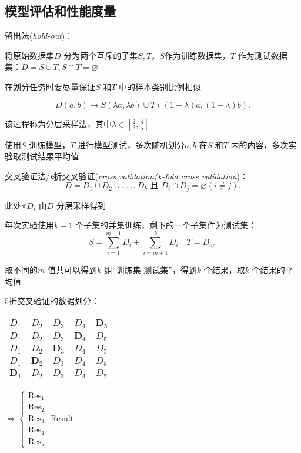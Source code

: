 \subsection{模型评估和性能度量}%
\label{sub:模型评估和性能度量}
\begin{notation}
    留出法(\textit{hold-out})：

    将原始数据集$D$ 分为两个互斥的子集$S,T$，$S$作为训练数据集，$T$ 作为测试数据集：$D=S\cup T,S\cap T=\varnothing $
\end{notation}
在划分任务时要尽量保证$S$ 和$T$ 中的样本类别比例相似
\begin{eg}
    \[
        D\left( a,b \right)  \to S\left( \lambda a,\lambda b \right) \cup T\left( \left( 1-\lambda \right) a,\left( 1-\lambda \right) b \right)
    .\] 

    该过程称为分层采样法，其中$\lambda\in [\frac{2}{3} , \frac{4}{5} ]$

    使用$S$ 训练模型，$T$ 进行模型测试，多次随机划分$a,b$ 在$S$ 和$T$ 内的内容，多次实验取测试结果平均值
\end{eg}
\begin{notation}
    交叉验证法/\textit{k}折交叉验证(\textit{cross validation}/\textit{k-fold cross validation})：\[
        D=D_1\cup D_2\cup \ldots\cup D_k\text{ 且 }D_i\cap D_j=\varnothing \left( i\neq j \right)
    .\]   

    此处$\forall D_i$ 由$D$ 分层采样得到

    每次实验使用$k-1$ 个子集的并集训练，剩下的一个子集作为测试集：\[
        S=\sum_{i=1}^{m-1} D_i + \sum_{i=m+1}^{k}D_i\quad T=D_m
    .\] 

    取不同的$m$ 值共可以得到$k$ 组“训练集-测试集”，得到$k$ 个结果，取$k$ 个结果的平均值
\end{notation}
\begin{eg}
    5折交叉验证的数据划分：
    \begin{table}[htpb]
        \centering
        \begin{tabular}{|c|c|c|c|c|}
        \hline
        $D_1$ & $D_2$ & $D_3$ & $D_4$ & $\bm{D}_5$ \\
        \hline
        $D_1$ & $D_2$ & $D_3$ & $\bm{D}_4$ & $D_5$ \\
        \hline
        $D_1$ & $D_2$ & $\bm{D}_3$ & $D_4$ & $D_5$ \\
        \hline
        $D_1$ & $\bm{D}_2$ & $D_3$ & $D_4$ & $D_5$ \\
        \hline
        $\bm{D}_1$ & $D_2$ & $D_3$ & $D_4$ & $D_5$ \\
        \hline
        \end{tabular}
        $\Rightarrow \begin{cases}
            \text{Res}_1\\
            \text{Res}_2\\
            \text{Res}_3\\
            \text{Res}_4\\
            \text{Res}_5
        \end{cases}$
        \ce{->[Avg.]}Result
    \end{table}
\end{eg}
